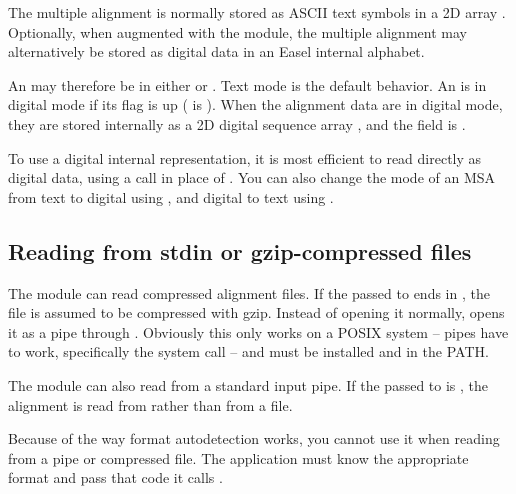 The multiple alignment is normally stored as ASCII text symbols in a
2D array . Optionally, when
augmented with the  module, the multiple alignment
may alternatively be stored as digital data in an Easel internal
alphabet.

An  may therefore be in either  or
. Text mode is the default behavior. An
 is in digital mode if its  flag
is up ( is ). When the
alignment data are in digital mode, they are stored internally as a 2D
digital sequence array , and
the  field is .

To use a digital internal representation, it is most efficient to read
directly as digital data, using a 
call in place of . You can also change the
mode of an MSA from text to digital using
, and digital to text using
.

\subsection{Reading from stdin or gzip-compressed files}

The module can read compressed alignment files.  If the
 passed to  ends in
, the file is assumed to be compressed with gzip. Instead
of opening it normally,  opens it as a pipe
through . Obviously this only works on a POSIX
system -- pipes have to work, specifically the  system
call -- and  must be installed and in the PATH.

The module can also read from a standard input pipe. If the
 passed to  is \ccode{-},
the alignment is read from  rather than from a file.

Because of the way format autodetection works, you cannot use it when
reading from a pipe or compressed file. The application must know the
appropriate format and pass that code it calls
.
